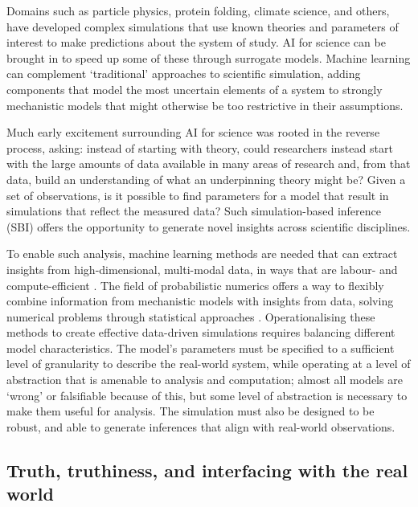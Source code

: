 Domains such as particle physics, protein folding, climate science, and
others, have developed complex simulations that use known theories and
parameters of interest to make predictions about the system of study. AI
for science can be brought in to speed up some of these through
surrogate models. Machine learning can complement `traditional'
approaches to scientific simulation, adding components that model the
most uncertain elements of a system to strongly mechanistic models that
might otherwise be too restrictive in their assumptions.

Much early excitement surrounding AI for science was rooted in the
reverse process, asking: instead of starting with theory, could
researchers instead start with the large amounts of data available in
many areas of research and, from that data, build an understanding of
what an underpinning theory might be? Given a set of observations, is it
possible to find parameters for a model that result in simulations that
reflect the measured data? Such simulation-based inference (SBI) offers
the opportunity to generate novel insights across scientific
disciplines.

To enable such analysis, machine learning methods are needed that can
extract insights from high-dimensional, multi-modal data, in ways that
are labour- and compute-efficient \cite{Cranmer-frontier2020}. The field of
probabilistic numerics offers a way to flexibly combine information from
mechanistic models with insights from data, solving numerical problems
through statistical approaches \cite{Hennig-probabilistic2022}. Operationalising these methods
to create effective data-driven simulations requires balancing different
model characteristics. The model's parameters must be specified to a
sufficient level of granularity to describe the real-world system, while
operating at a level of abstraction that is amenable to analysis and
computation; almost all models are `wrong' or falsifiable because of
this, but some level of abstraction is necessary to make them useful for
analysis. The simulation must also be designed to be robust, and able to
generate inferences that align with real-world observations.

\subsection{Truth, truthiness, and interfacing with the real
world}\label{truth-truthiness-and-interfacing-with-the-real-world}

